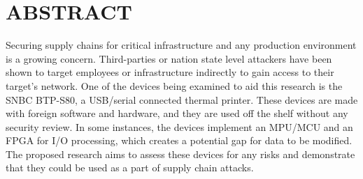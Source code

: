 \chapter*{\Large \uppercase{Abstract}}
\label{chap:Abstract}

Securing supply chains for critical infrastructure and any production environment is a growing concern. Third-parties or nation state level attackers have been shown to target employees or infrastructure indirectly to gain access to their target's network. One of the devices being examined to aid this research is the SNBC BTP-S80, a USB/serial connected thermal printer. These devices are made with foreign software and hardware, and they are used off the shelf without any security review. In some instances, the devices implement an MPU/MCU and an FPGA for I/O processing, which creates a potential gap for data to be modified. The proposed research aims to assess these devices for any risks and demonstrate that they could be used as a part of supply chain attacks.